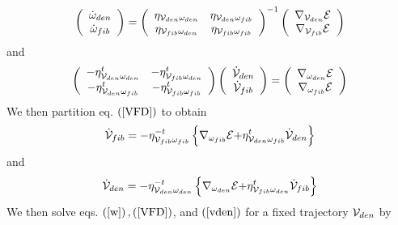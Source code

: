 \begin{equation}
\left( 
\begin{array}{c}
\dot{\omega}_{den} \\ 
\dot{\omega}_{fib}%
\end{array}%
\right) =\left( 
\begin{array}{cc}
\eta _{{\cal V}_{den}\omega _{den}} & \eta _{{\cal V}_{den}\omega _{fib}} \\ 
\eta _{{\cal V}_{fib}\omega _{den}} & \eta _{{\cal V}_{fib}\omega _{fib}}%
\end{array}%
\right) ^{-1}\left( 
\begin{array}{c}
\nabla _{{\cal V}_{den}}{\cal E} \\ 
\nabla _{{\cal V}_{fib}}{\cal E}%
\end{array}%
\right)  \label{w}
\end{equation}%
and 
\begin{equation}
\left( 
\begin{array}{cc}
-\eta _{{\cal V}_{den}\omega _{den}}^{t} & -\eta _{{\cal V}_{fib}\omega
_{den}}^{t} \\ 
-\eta _{{\cal V}_{den}\omega _{fib}}^{t} & -\eta _{{\cal V}_{fib}\omega
_{fib}}^{t}%
\end{array}%
\right) \left( 
\begin{array}{c}
{\cal \dot{V}}_{den} \\ 
{\cal \dot{V}}_{fib}%
\end{array}%
\right) =\left( 
\begin{array}{c}
\nabla _{\omega _{den}}{\cal E} \\ 
\nabla _{\omega _{fib}}{\cal E}%
\end{array}%
\right)  \label{VFD}
\end{equation}%
We then partition eq. $\left( \ref{VFD}\right) $ to obtain 
\begin{equation}
{\cal \dot{V}}_{fib}=-\eta _{{\cal V}_{fib}\omega _{fib}}^{-t}\left\{ \nabla
_{\omega _{fib}}{\cal E+}\eta _{{\cal V}_{den}\omega _{fib}}^{t}{\cal \dot{V}%
}_{den}\right\}  \label{vfib}
\end{equation}%
and 
\begin{equation}
{\cal \dot{V}}_{den}=-\eta _{{\cal V}_{den}\omega _{den}}^{-t}\left\{ \nabla
_{\omega _{den}}{\cal E+}\eta _{{\cal V}_{fib}\omega _{den}}^{t}{\cal \dot{V}%
}_{fib}\right\}  \label{vden}
\end{equation}%
We then solve eqs. $\left( \ref{w}\right) ,\left( \ref{VFD}\right) $, and $%
\left( \ref{vden}\right) $ for a fixed trajectory ${\cal V}_{den}$ by

